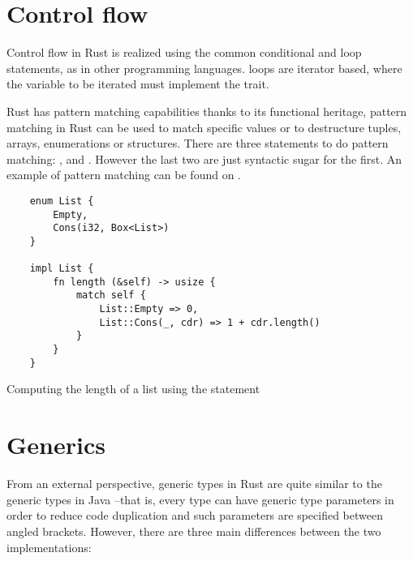 \section{Control flow}

Control flow in Rust is realized using the common  conditional
and  loop statements, as in other programming languages.
 loops are iterator based, where the variable to be iterated must
implement the  trait.

Rust has pattern matching capabilities thanks to its functional heritage,
pattern matching in Rust can be used to match specific values or to destructure
tuples, arrays, enumerations or structures. There are three statements to do
pattern matching: ,  and .
However the last two are just syntactic sugar for the first. An example of
pattern matching can be found on .

\begin{listing}[h]
	\begin{verbatim}
    enum List {
        Empty,
        Cons(i32, Box<List>)
    }

    impl List {
        fn length (&self) -> usize {
            match self {
                List::Empty => 0,
                List::Cons(_, cdr) => 1 + cdr.length()
            }
        } 
    }
    \end{verbatim}
    \caption{Computing the length of a list using the  statement}
  \label{lst:match}
\end{listing}

\section{Generics}
\label{sec:generics}

From an external perspective, generic types in Rust are quite similar to the
generic types in Java --that is, every type can have generic type parameters in
order to reduce code duplication and such parameters are specified between
angled brackets. However, there are three main differences between the two
implementations:

